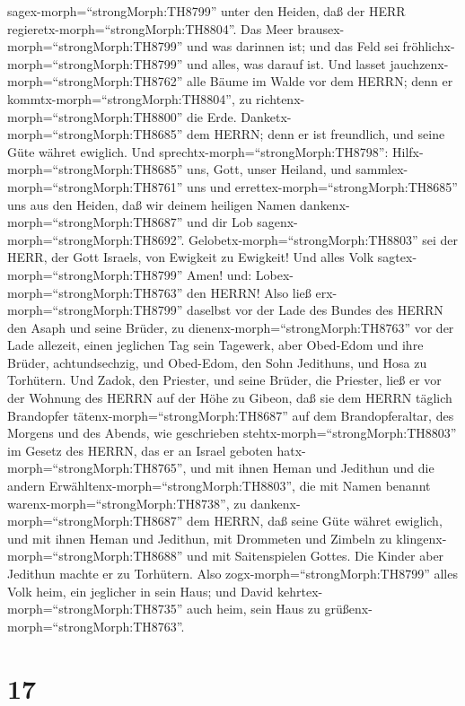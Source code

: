 sagex-morph=``strongMorph:TH8799'' unter den Heiden, daß der HERR
regieretx-morph=``strongMorph:TH8804''.  Das Meer
brausex-morph=``strongMorph:TH8799'' und was darinnen ist; und das Feld
sei fröhlichx-morph=``strongMorph:TH8799'' und alles, was darauf ist.
 Und lasset jauchzenx-morph=``strongMorph:TH8762'' alle
Bäume im Walde vor dem HERRN; denn er
kommtx-morph=``strongMorph:TH8804'', zu
richtenx-morph=``strongMorph:TH8800'' die Erde. 
Danketx-morph=``strongMorph:TH8685'' dem HERRN; denn er ist freundlich,
und seine Güte währet ewiglich.  Und
sprechtx-morph=``strongMorph:TH8798'':
Hilfx-morph=``strongMorph:TH8685'' uns, Gott, unser Heiland, und
sammlex-morph=``strongMorph:TH8761'' uns und
errettex-morph=``strongMorph:TH8685'' uns aus den Heiden, daß wir deinem
heiligen Namen dankenx-morph=``strongMorph:TH8687'' und dir Lob
sagenx-morph=``strongMorph:TH8692''. 
Gelobetx-morph=``strongMorph:TH8803'' sei der HERR, der Gott Israels,
von Ewigkeit zu Ewigkeit! Und alles Volk
sagtex-morph=``strongMorph:TH8799'' Amen! und:
Lobex-morph=``strongMorph:TH8763'' den HERRN!  Also ließ
erx-morph=``strongMorph:TH8799'' daselbst vor der Lade des Bundes des
HERRN den Asaph und seine Brüder, zu
dienenx-morph=``strongMorph:TH8763'' vor der Lade allezeit, einen
jeglichen Tag sein Tagewerk,  aber Obed-Edom und ihre
Brüder, achtundsechzig, und Obed-Edom, den Sohn Jedithuns, und Hosa zu
Torhütern.  Und Zadok, den Priester, und seine Brüder, die
Priester, ließ er vor der Wohnung des HERRN auf der Höhe zu Gibeon,
 daß sie dem HERRN täglich Brandopfer
tätenx-morph=``strongMorph:TH8687'' auf dem Brandopferaltar, des Morgens
und des Abends, wie geschrieben stehtx-morph=``strongMorph:TH8803'' im
Gesetz des HERRN, das er an Israel geboten
hatx-morph=``strongMorph:TH8765'',  und mit ihnen Heman und
Jedithun und die andern Erwähltenx-morph=``strongMorph:TH8803'', die mit
Namen benannt warenx-morph=``strongMorph:TH8738'', zu
dankenx-morph=``strongMorph:TH8687'' dem HERRN, daß seine Güte währet
ewiglich,  und mit ihnen Heman und Jedithun, mit Drommeten
und Zimbeln zu klingenx-morph=``strongMorph:TH8688'' und mit
Saitenspielen Gottes. Die Kinder aber Jedithun machte er zu Torhütern.
 Also zogx-morph=``strongMorph:TH8799'' alles Volk heim,
ein jeglicher in sein Haus; und David
kehrtex-morph=``strongMorph:TH8735'' auch heim, sein Haus zu
grüßenx-morph=``strongMorph:TH8763''.

\hypertarget{section-16}{%
\section{17}\label{section-16}}

